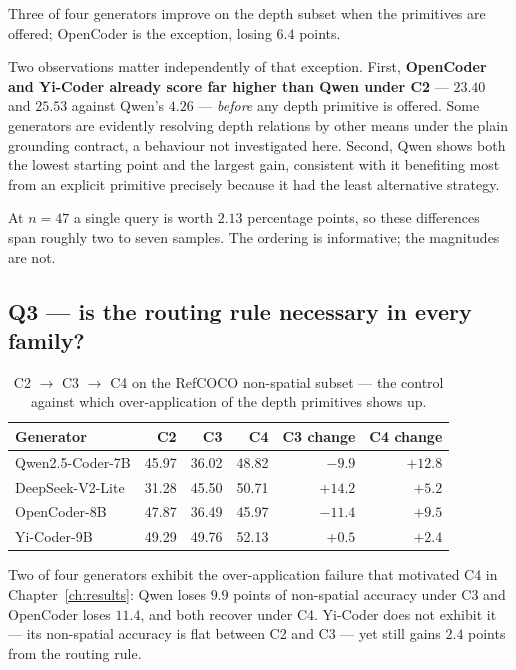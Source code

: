 \documentclass[12pt,a4paper,oneside]{report}
\begin{document}
Three of four generators improve on the depth subset when the primitives are offered;
OpenCoder is the exception, losing $6.4$ points.

Two observations matter independently of that exception. First, \textbf{OpenCoder and
Yi-Coder already score far higher than Qwen under C2} --- $23.40$ and $25.53$ against
Qwen's $4.26$ --- \emph{before} any depth primitive is offered. Some generators are
evidently resolving depth relations by other means under the plain grounding contract,
a behaviour not investigated here. Second, Qwen shows both the lowest starting point
and the largest gain, consistent with it benefiting most from an explicit primitive
precisely because it had the least alternative strategy.

At $n=47$ a single query is worth $2.13$ percentage points, so these differences span
roughly two to seven samples. The ordering is informative; the magnitudes are not.

\subsection{Q3 --- is the routing rule necessary in every family?}

\begin{table}[htbp]\centering
\caption{C2 $\to$ C3 $\to$ C4 on the RefCOCO non-spatial subset --- the control
against which over-application of the depth primitives shows up.}
\label{tab:m4-q3}
\begin{tabular}{@{}lrrrrr@{}}
\toprule
\textbf{Generator} & \textbf{C2} & \textbf{C3} & \textbf{C4} & \textbf{C3 change} & \textbf{C4 change} \\
\midrule
Qwen2.5-Coder-7B & 45.97 & 36.02 & 48.82 & $-9.9$ & $+12.8$ \\
DeepSeek-V2-Lite & 31.28 & 45.50 & 50.71 & $+14.2$ & $+5.2$ \\
OpenCoder-8B & 47.87 & 36.49 & 45.97 & $-11.4$ & $+9.5$ \\
Yi-Coder-9B & 49.29 & 49.76 & 52.13 & $+0.5$ & $+2.4$ \\
\bottomrule
\end{tabular}
\end{table}

Two of four generators exhibit the over-application failure that motivated C4 in
Chapter~\ref{ch:results}: Qwen loses $9.9$ points of non-spatial accuracy under C3
and OpenCoder loses $11.4$, and both recover under C4. Yi-Coder does not exhibit it
--- its non-spatial accuracy is flat between C2 and C3 --- yet still gains $2.4$
points from the routing rule.
\end{document}
